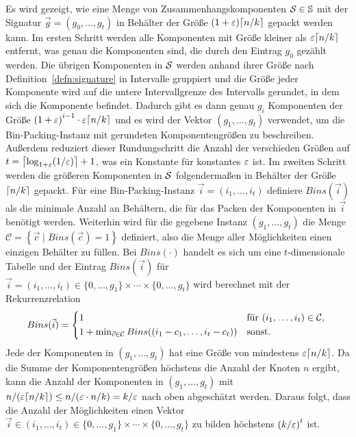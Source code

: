 Es wird gezeigt, wie eine Menge von Zusammenhangskomponenten $\calS \in \bbS$ mit der Signatur $\vec{g} = (g_0, \ldots, g_t)$ in Behälter der Größe $(1 + \eps) \ceil{n/k}$ gepackt werden kann.
Im ersten Schritt werden alle Komponenten mit Größe kleiner als $\eps \ceil*{n/k}$ entfernt, was genau die Komponenten sind, die durch den Eintrag $g_0$ gezählt werden.
Die übrigen Komponenten in $\calS$ werden anhand ihrer Größe nach Definition~\ref{defn:signature} in Intervalle gruppiert und die Größe jeder Komponente wird auf die untere Intervallgrenze des Intervalls gerundet, in dem sich die Komponente befindet.
Dadurch gibt es dann genau $g_i$ Komponenten der Größe ${(1 + \eps)}^{i-1} \cdot \eps \ceil*{n/k}$ und es wird der Vektor $(g_1, \ldots, g_t)$ verwendet, um die Bin-Packing-Instanz mit gerundeten Komponentengrößen zu beschreiben. 
Außerdem reduziert dieser Rundungschritt die Anzahl der verschieden Größen auf $t = \ceil*{\log_{1+\eps}(1/\eps)} + 1$, was ein Konstante für konstantes $\eps$ ist.
Im zweiten Schritt werden die größeren Komponenten in $\calS$ folgendermaßen in Behälter der Größe $\ceil{n/k}$ gepackt.
Für eine Bin-Packing-Instanz $\vec{i} = (i_1, \ldots, i_t)$ definiere $Bins(\vec{i})$ als die minimale Anzahl an Behältern, die für das Packen der Komponenten in $\vec{i}$ benötigt werden.
Weiterhin wird für die gegebene Instanz $(g_1, \ldots, g_t)$ die Menge $\mathcal{C} = \left\{ \vec{c} \mid Bins(\vec{c}) = 1 \right\}$ definiert, also die Menge aller Möglichkeiten einen einzigen Behälter zu füllen.
Bei $Bins(\cdot)$ handelt es sich um eine $t$-dimensionale Tabelle und der Eintrag $Bins(\vec{i})$ für $\vec{i} = (i_1, \ldots, i_t) \in \{0, \ldots, g_1\} \times \cdots \times \{0, \ldots, g_t\}$ wird berechnet mit der Rekurrenzrelation 
\begin{equation}\label{eq:packing}
    Bins(\vec{i}) = 
    \begin{cases*}
        1 & für $(i_1, \ldots, i_t) \in \mathcal{C}$, \\
        1 + \min_{\vec{c} \in \mathcal{C}} Bins((i_1 - c_1, \ldots, i_t - c_t)) & sonst. \\
    \end{cases*}
\end{equation}
Jede der Komponenten in $(g_1, \ldots, g_t)$ hat eine Größe von mindestens $\eps \ceil*{n/k}$. 
Da die Summe der Komponentengrößen höchstens die Anzahl der Knoten $n$ ergibt, kann die Anzahl der Komponenten in $(g_1, \ldots, g_t)$ mit $n / (\eps \ceil{n/k}) \leq n / (\eps \cdot n/k) = k/\eps$ nach oben abgeschätzt werden.
Daraus folgt, dass die Anzahl der Möglichkeiten einen Vektor $\vec{i} \in (i_1, \ldots, i_t) \in \{0, \ldots, g_1\} \times \cdots \times \{0, \ldots, g_t\}$ zu bilden höchstens ${(k/\eps)}^t$ ist.
